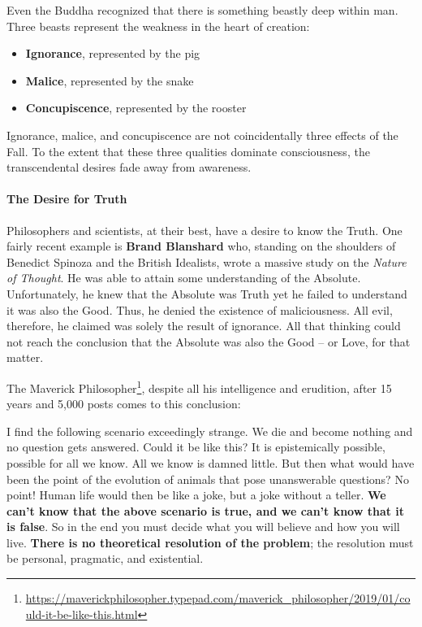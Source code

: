 Even the Buddha recognized that there is something beastly deep within man. Three beasts represent the weakness in the heart of creation:

\begin{itemize}


\item \textbf{Ignorance}, represented by the pig


\item \textbf{Malice}, represented by the snake


\item \textbf{Concupiscence}, represented by the rooster

\end{itemize}


Ignorance, malice, and concupiscence are not coincidentally three effects of the Fall. To the extent that these three qualities dominate consciousness, the transcendental desires fade away from awareness.

\paragraph{The Desire for Truth}


Philosophers and scientists, at their best, have a desire to know the Truth. One fairly recent example is \textbf{Brand Blanshard} who, standing on the shoulders of Benedict Spinoza and the British Idealists, wrote a massive study on the \emph{Nature of Thought}. He was able to attain some understanding of the Absolute. Unfortunately, he knew that the Absolute was Truth yet he failed to understand it was also the Good. Thus, he denied the existence of maliciousness. All evil, therefore, he claimed was solely the result of ignorance. All that thinking could not reach the conclusion that the Absolute was also the Good -- or Love, for that matter.

The Maverick Philosopher\footnote{\url{https://maverickphilosopher.typepad.com/maverick\_philosopher/2019/01/could-it-be-like-this.html}}, despite all his intelligence and erudition, after 15 years and 5,000 posts comes to this conclusion:

\begin{quotex}
I find the following scenario exceedingly strange. We die and become nothing and no question gets answered. Could it be like this? It is epistemically possible, possible for all we know. All we know is damned little. But then what would have been the point of the evolution of animals that pose unanswerable questions? No point! Human life would then be like a joke, but a joke without a teller. \textbf{We can't know that the above scenario is true, and we can't know that it is false}. So in the end you must decide what you will believe and how you will live. \textbf{There is no theoretical resolution of the problem}; the resolution must be personal, pragmatic, and existential.
\end{quotex}



